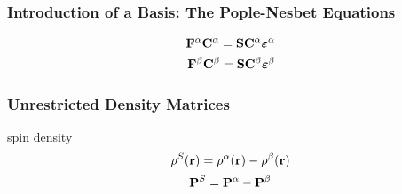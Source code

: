 \documentclass[a4paper]{article}
\numberwithin{equation}{section}
\begin{document}
\subsubsection{Introduction of a Basis: The Pople-Nesbet Equations}
\begin{align}
\vb{F}^\alpha \vb{C}^\alpha = \vb{S} \vb{C}^\alpha \bm\varepsilon^\alpha \\
\vb{F}^\beta \vb{C}^\beta = \vb{S} \vb{C}^\beta \bm\varepsilon^\beta
\end{align}

\subsubsection{Unrestricted Density Matrices}
spin density
\begin{equation}\label{key}
\rho^S(\vb{r}) = \rho^\alpha(\vb{r}) - \rho^\beta(\vb{r})
\end{equation}
\begin{equation}\label{key}
\vb{P}^S = \vb{P}^\alpha - \vb{P}^\beta
\end{equation}
\end{document}
